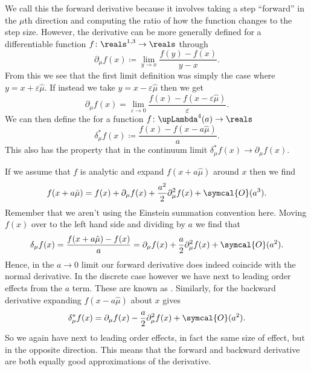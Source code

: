 \documentclass[fleqn]{NotesClass}
\newcommand{\order}{\symcal{O}}
\newcommand{\minkowskiSpace}{\reals^{1,3}}
\newcommand{\lattice}[1][4]{\upLambda^{#1}}
\newcommand{\forwardDerivative}{\delta}
\newcommand{\backwardDerivative}{\delta^*}
\begin{document}
    We call this the forward derivative because it involves taking a step \enquote{forward} in the \(\mu\)th direction and computing the ratio of how the function changes to the step size.
    However, the derivative can be more generally defined for a differentiable function \(f \colon \minkowskiSpace \to \reals\) through
    \begin{equation}
        \partial_\mu f(x) \coloneqq \lim_{y \to x} \frac{f(y) - f(x)}{y - x}.
    \end{equation}
    From this we see that the first limit definition was simply the case where \(y = x + \varepsilon\hat{\mu}\).
    If instead we take \(y = x - \varepsilon\hat{\mu}\) then we get
    \begin{equation}
        \partial_\mu f(x) = \lim_{\varepsilon \to 0} \frac{f(x) - f(x - \varepsilon\hat{\mu})}{\varepsilon}.
    \end{equation}
    We can then define the  for a function \(f \colon \lattice(a) \to \reals\)
    \begin{equation}
        \backwardDerivative_\mu f(x) \coloneqq \frac{f(x) - f(x - a\hat{\mu})}{a}.
    \end{equation}
    This also has the property that in the continuum limit \(\backwardDerivative_\mu f(x) \to \partial_\mu f(x)\).
    
    If we assume that \(f\) is analytic and expand \(f(x + a\hat{\mu})\) around \(x\) then we find
    \begin{equation}
        f(x + a\hat{\mu}) = f(x) + \partial_\mu f(x) + \frac{a^2}{2}\partial_\mu^2 f(x) + \order(a^3).
    \end{equation}
    Remember that we aren't using the Einstein summation convention here.
    Moving \(f(x)\) over to the left hand side and dividing by \(a\) we find that
    \begin{equation}
        \forwardDerivative_\mu f(x) = \frac{f(x + a\hat{\mu}) - f(x)}{a} = \partial_\mu f(x) + \frac{a}{2}\partial_\mu^2 f(x) + \order(a^2).
    \end{equation}
    Hence, in the \(a \to 0\) limit our forward derivative does indeed coincide with the normal derivative.
    In the discrete case however we have next to leading order effects from the \(a\) term.
    These are known as .
    Similarly, for the backward derivative expanding \(f(x - a\hat{\mu})\) about \(x\) gives
    \begin{equation}
        \backwardDerivative_\mu f(x) = \partial_\mu f(x) - \frac{a}{2}\partial_\mu^2f(x) + \order(a^2).
    \end{equation}
    So we again have next to leading order effects, in fact the same size of effect, but in the opposite direction.
    This means that the forward and backward derivative are both equally good approximations of the derivative.
    
\end{document}
